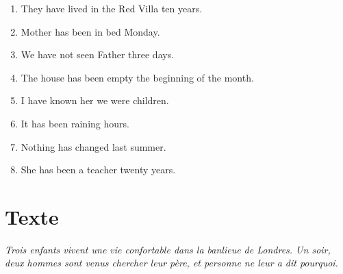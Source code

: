 \documentclass[troisieme]{fiche}
\begin{document}



\begin{anglais}
\begin{enumerate}[label=\arabic*.,itemsep=2.5mm,leftmargin=*]
  \item They have lived in the Red Villa  ten years.
  \item Mother has been in bed  Monday.
  \item We have not seen Father  three days.
  \item The house has been empty  the beginning of the month.
  \item I have known her  we were children.
  \item It has been raining  hours.
  \item Nothing has changed  last summer.
  \item She has been a teacher  twenty years.
\end{enumerate}
\end{anglais}


\newpage
\section{Texte}

\noindent\small\textit{Trois enfants vivent une vie confortable dans la banlieue de Londres.
Un soir, deux hommes sont venus chercher leur père, et personne ne leur a dit
pourquoi.}\normalsize
\end{document}
